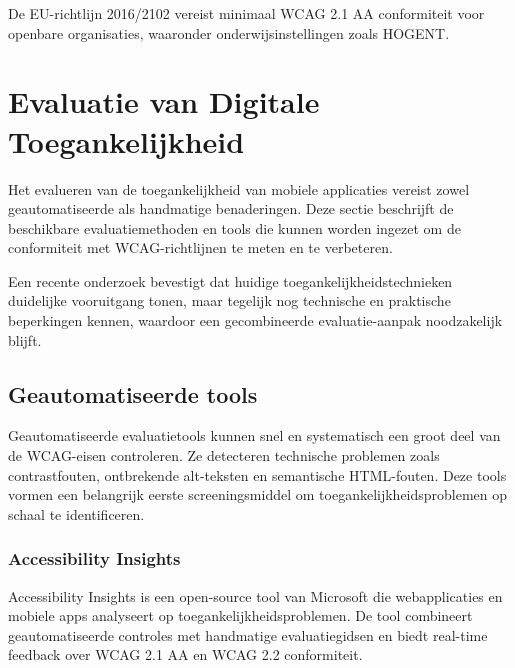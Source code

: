 De EU-richtlijn 2016/2102 vereist minimaal WCAG 2.1 AA conformiteit voor openbare organisaties, waaronder onderwijsinstellingen zoals HOGENT.


\section{Evaluatie van Digitale Toegankelijkheid}
\label{sec:evaluatie-toegankelijkheid}

Het evalueren van de toegankelijkheid van mobiele applicaties vereist zowel geautomatiseerde als handmatige benaderingen. Deze sectie beschrijft de beschikbare evaluatiemethoden en tools die kunnen worden ingezet om de conformiteit met WCAG-richtlijnen te meten en te verbeteren.

Een recente onderzoek bevestigt dat huidige toegankelijkheidstechnieken duidelijke vooruitgang tonen, maar tegelijk nog technische en praktische beperkingen kennen, waardoor een gecombineerde evaluatie-aanpak noodzakelijk blijft. \autocite{Popescu2024}

\subsection{Geautomatiseerde tools}
\label{subsec:geautomatiseerde-tools}

Geautomatiseerde evaluatietools kunnen snel en systematisch een groot deel van de WCAG-eisen controleren. Ze detecteren technische problemen zoals contrastfouten, ontbrekende alt-teksten en semantische HTML-fouten. Deze tools vormen een belangrijk eerste screeningsmiddel om toegankelijkheidsproblemen op schaal te identificeren.

\subsubsection{Accessibility Insights}

Accessibility Insights is een open-source tool van Microsoft die webapplicaties en mobiele apps analyseert op toegankelijkheidsproblemen. De tool combineert geautomatiseerde controles met handmatige evaluatiegidsen en biedt real-time feedback over WCAG 2.1 AA en WCAG 2.2 conformiteit. \autocite{MicrosoftAccessibilityInsights2024}

